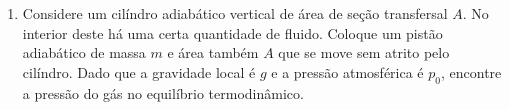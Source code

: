 \begin{enumerate}
    \item
        Considere um cilíndro adiabático vertical de área de seção transfersal
        $A$. No interior deste há uma certa quantidade de fluido. Coloque um
        pistão adiabático de massa $m$ e área também $A$ que se move sem atrito
        pelo cilíndro. Dado que a gravidade local é $g$ e a pressão atmosférica
        é $p_0$, encontre a pressão do gás no equilíbrio termodinâmico.
\end{enumerate}
